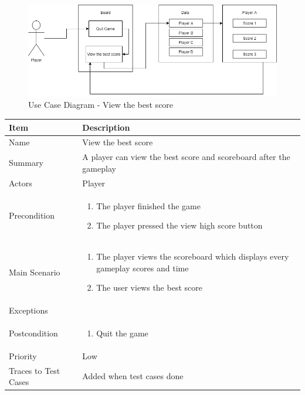 \documentclass[12pt]{article}
\begin{document}
\begin{figure}[htbp]
    \centering
    \includegraphics[scale=0.6]{iteration1/images/ViewTheBestScore.png}
    \caption{Use Case Diagram - View the best score}
    \label{fig:ViewTheBestScore}
\end{figure}

\begin{center}
\setlength{\tabcolsep}{18pt}
\renewcommand{\arraystretch}{1.3}
\begin{tabular}{ |p{3cm}|p{10cm}| }
    \hline
    \rowcolor{green}
   Item & Description \\
    \hline
    Name & View the best score \\
    \hline
    Summary & A player can view the best score and scoreboard after the gameplay \\
    \hline
    Actors & Player \\
    \hline
    Precondition & 
    \vspace*{-0.2in}
    \begin{enumerate}
        \item The player finished the game
        \item The player pressed the view high score button
    \end{enumerate}  \\
    \hline
    Main Scenario &     
    \vspace*{-0.2in}
    \begin{enumerate}
        \item The player views the scoreboard which displays every gameplay scores and time
        \item The user views the best score
    \end{enumerate}  \\
    \hline
    Exceptions & \\
    \hline
    Postcondition &
    \vspace*{-0.2in}
    \begin{enumerate}
        \item Quit the game
    \end{enumerate}  \\
    \hline
    Priority & Low \\
    \hline
    Traces to Test Cases & Added when test cases done  \\
    \hline
\end{tabular}
\end{center}
\end{document}
